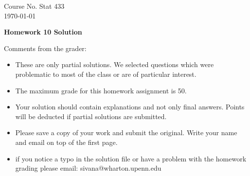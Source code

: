\documentclass[10pt,a4paper]{article}
\begin{document}
\begin{flushleft}
Course No. Stat 433 \\
\today
\end{flushleft}

\begin{center}
{\Large{\bf  Homework 10 Solution}}
\end{center}

\textcolor[rgb]{0.98,0.00,0.00}{Comments from the grader:}
\begin{itemize}

    \item \textcolor[rgb]{0.98,0.00,0.00}{These are only partial solutions.  We selected
    questions which were problematic to most of the class or are of particular interest.}
    \item \textcolor[rgb]{0.98,0.00,0.00}{The maximum grade for this homework assignment is 50.}
    \item \textcolor[rgb]{0.98,0.00,0.00}{Your solution should contain explanations and not only
    final answers. Points will be deducted if partial solutions
    are submitted.}
    \item \textcolor[rgb]{0.98,0.00,0.00}{Please save a copy of your work and submit the original.
    Write your name and email on top of the first page.}
    \item \textcolor[rgb]{0.98,0.00,0.00}{if you notice a typo in the solution file or have a problem with the homework
    grading please email: sivana@wharton.upenn.edu
}
\end{itemize}
\end{document}
